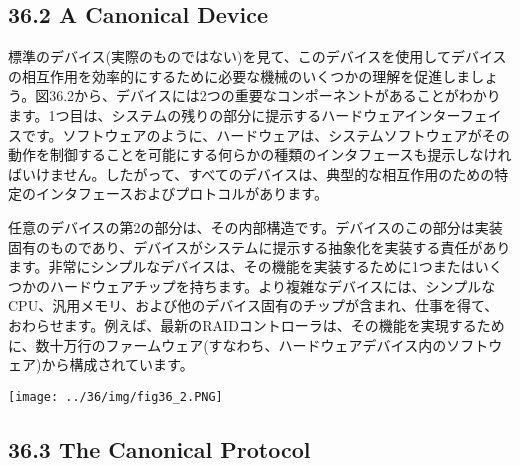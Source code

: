 \hypertarget{a-canonical-device}{%
\subsection*{36.2 A Canonical Device}\label{a-canonical-device}}

標準のデバイス(実際のものではない)を見て、このデバイスを使用してデバイスの相互作用を効率的にするために必要な機械のいくつかの理解を促進しましょう。図36.2から、デバイスには2つの重要なコンポーネントがあることがわかります。1つ目は、システムの残りの部分に提示するハードウェアインターフェイスです。ソフトウェアのように、ハードウェアは、システムソフトウェアがその動作を制御することを可能にする何らかの種類のインタフェースも提示しなければいけません。したがって、すべてのデバイスは、典型的な相互作用のための特定のインタフェースおよびプロトコルがあります。

任意のデバイスの第2の部分は、その内部構造です。デバイスのこの部分は実装固有のものであり、デバイスがシステムに提示する抽象化を実装する責任があります。非常にシンプルなデバイスは、その機能を実装するために1つまたはいくつかのハードウェアチップを持ちます。より複雑なデバイスには、シンプルなCPU、汎用メモリ、および他のデバイス固有のチップが含まれ、仕事を得て、おわらせます。例えば、最新のRAIDコントローラは、その機能を実現するために、数十万行のファームウェア(すなわち、ハードウェアデバイス内のソフトウェア)から構成されています。

\texttt{[image: ../36/img/fig36\_2.PNG]}

\hypertarget{the-canonical-protocol}{%
\subsection*{36.3 The Canonical Protocol}\label{the-canonical-protocol}}

